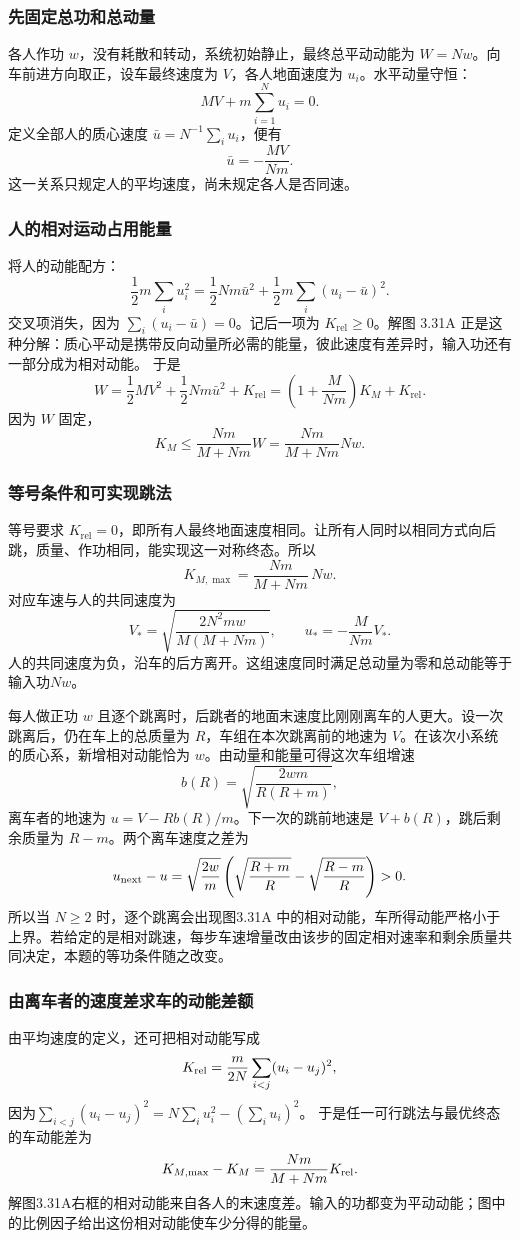 \documentclass[UTF8,fontset=fandol,a4paper,11pt]{ctexart}
\begin{document}
\subsubsection*{先固定总功和总动量}
各人作功 $w$，没有耗散和转动，系统初始静止，最终总平动动能为
$W=Nw$。向车前进方向取正，设车最终速度为 $V$，各人地面速度为 $u_i$。水平动量守恒：
\[
MV+m\sum_{i=1}^N u_i=0.
\]
定义全部人的质心速度 $\bar u=N^{-1}\sum_i u_i$，便有
\[
\bar u=-\frac{MV}{Nm}.
\]
这一关系只规定人的平均速度，尚未规定各人是否同速。

\subsubsection*{人的相对运动占用能量}
将人的动能配方：
\[
\frac12m\sum_i u_i^2
=\frac12Nm\bar u^2+\frac12m\sum_i(u_i-\bar u)^2.
\]
交叉项消失，因为 $\sum_i(u_i-\bar u)=0$。记后一项为 $K_{\mathrm{rel}}\geq0$。解图 3.31A 正是这种分解：质心平动是携带反向动量所必需的能量，彼此速度有差异时，输入功还有一部分成为相对动能。
于是
\[
W=\frac12MV^2+\frac12Nm\bar u^2+K_{\mathrm{rel}}
=\left(1+\frac{M}{Nm}\right)K_M+K_{\mathrm{rel}}.
\]
因为 $W$ 固定，
\[
\boxed{K_M\leq\frac{Nm}{M+Nm}W
=\frac{Nm}{M+Nm}Nw}.
\]

\subsubsection*{等号条件和可实现跳法}
等号要求 $K_{\mathrm{rel}}=0$，即所有人最终地面速度相同。让所有人同时以相同方式向后跳，质量、作功相同，能实现这一对称终态。所以
\[
\boxed{K_{M,\max}=\frac{Nm}{M+Nm}\,Nw}.
\]
对应车速与人的共同速度为
\[
V_*=\sqrt{\frac{2N^2mw}{M(M+Nm)}},\qquad
u_*=-\frac{M}{Nm}V_*.
\]
人的共同速度为负，沿车的后方离开。这组速度同时满足总动量为零和总动能等于输入功$Nw$。

每人做正功 $w$ 且逐个跳离时，后跳者的地面末速度比刚刚离车的人更大。设一次跳离后，仍在车上的总质量为 $R$，车组在本次跳离前的地速为 $V$。在该次小系统的质心系，新增相对动能恰为 $w$。由动量和能量可得这次车组增速
\[
b(R)=\sqrt{\frac{2wm}{R(R+m)}},
\]
离车者的地速为 $u=V-Rb(R)/m$。下一次的跳前地速是 $V+b(R)$，跳后剩余质量为 $R-m$。两个离车速度之差为
\[
u_{\rm next}-u
=\sqrt{\frac{2w}{m}}\left(\sqrt{\frac{R+m}{R}}-\sqrt{\frac{R-m}{R}}\right)>0 .
\]
所以当 $N\ge2$ 时，逐个跳离会出现图3.31A 中的相对动能，车所得动能严格小于上界。若给定的是相对跳速，每步车速增量改由该步的固定相对速率和剩余质量共同决定，本题的等功条件随之改变。
\subsubsection*{由离车者的速度差求车的动能差额}
由平均速度的定义，还可把相对动能写成
\[
K_{\rm rel}=\frac{m}{2N}\sum_{i<j}(u_i-u_j)^2,
\]
因为$\sum_{i<j}(u_i-u_j)^2=N\sum_i u_i^2-(\sum_i u_i)^2$。
于是任一可行跳法与最优终态的车动能差为
\[
K_{M,\max}-K_M=\frac{Nm}{M+Nm}K_{\rm rel}.
\]
解图3.31A右框的相对动能来自各人的末速度差。输入的功都变为平动动能；图中的比例因子给出这份相对动能使车少分得的能量。
\end{document}
